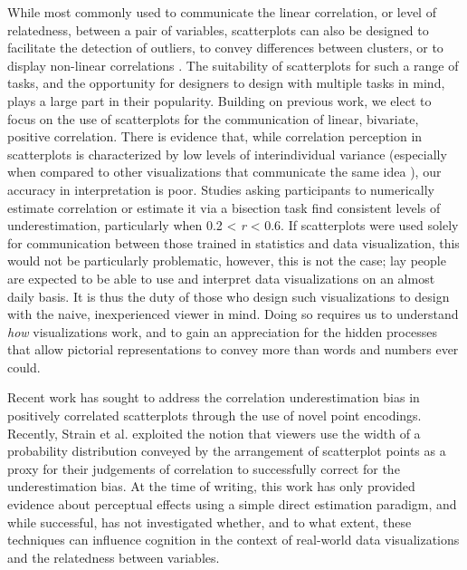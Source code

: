 \documentclass[manuscript,screen,review,anonymous]{acmart}
\begin{document}
While most commonly used to communicate the linear correlation, or level
of relatedness, between a pair of variables, scatterplots can also be
designed to facilitate the detection of outliers, to convey differences
between clusters, or to display non-linear correlations
\citep{sarikaya_2018}. The suitability of scatterplots for such a range
of tasks, and the opportunity for designers to design with multiple
tasks in mind, plays a large part in their popularity. Building on
previous work, we elect to focus on the use of scatterplots for the
communication of linear, bivariate, positive correlation. There is
evidence that, while correlation perception in scatterplots is
characterized by low levels of interindividual variance (especially when
compared to other visualizations that communicate the same idea
\citep{harrison_2014, kay_2015}), our accuracy in interpretation is
poor. Studies asking participants to numerically estimate correlation
\citep{strahan_1978, bobko_1979, cleveland_1982, lane_1985, lauer_1989, collyer_1990, meyer_1992}
or estimate it via a bisection task \citep{rensink_2017} find consistent
levels of underestimation, particularly when 0.2 \textless{} \emph{r}
\textless{} 0.6. If scatterplots were used solely for communication
between those trained in statistics and data visualization, this would
not be particularly problematic, however, this is not the case; lay
people are expected to be able to use and interpret data visualizations
on an almost daily basis. It is thus the duty of those who design such
visualizations to design with the naive, inexperienced viewer in mind.
Doing so requires us to understand \emph{how} visualizations work, and
to gain an appreciation for the hidden processes that allow pictorial
representations to convey more than words and numbers ever could.

Recent work has sought to address the correlation underestimation bias
in positively correlated scatterplots through the use of novel point
encodings. Recently, Strain et al.
\citep{strain_2023, strain_2023b, strain_2024} exploited the notion that
viewers use the width of a probability distribution conveyed by the
arrangement of scatterplot points as a proxy for their judgements of
correlation to successfully correct for the underestimation bias. At the
time of writing, this work has only provided evidence about perceptual
effects using a simple direct estimation paradigm, and while successful,
has not investigated whether, and to what extent, these techniques can
influence cognition in the context of real-world data visualizations and
the relatedness between variables.
\end{document}
